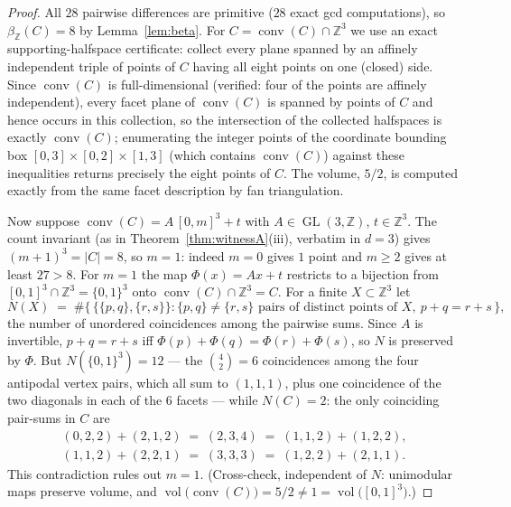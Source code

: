 \documentclass[11pt]{article}
\theoremstyle{remark}
\newcommand{\Z}{\mathbb{Z}}
\newcommand{\conv}{\operatorname{conv}}
\newcommand{\vol}{\operatorname{vol}}
\newcommand{\betaZ}{\beta_{\Z}}
\newcommand{\GL}{\operatorname{GL}}
\begin{document}
\begin{proof}
All $28$ pairwise differences are primitive ($28$ exact gcd computations),
so $\betaZ(C) = 8$ by Lemma~\ref{lem:beta}. For $C = \conv(C) \cap \Z^3$ we
use an exact supporting-halfspace certificate: collect every plane spanned by
an affinely independent triple of points of $C$ having all eight points on
one (closed) side. Since $\conv(C)$ is full-dimensional (verified: four of
the points are affinely independent), every facet plane of $\conv(C)$ is
spanned by points of $C$ and hence occurs in this collection, so the
intersection of the collected halfspaces is exactly $\conv(C)$; enumerating
the integer points of the coordinate bounding box
$[0,3] \times [0,2] \times [1,3]$ (which contains $\conv(C)$) against these
inequalities returns precisely the eight points of $C$. The volume,
$5/2$, is computed exactly from the same facet description by fan
triangulation.

Now suppose $\conv(C) = A\,[0,m]^3 + t$ with $A \in \GL(3,\Z)$,
$t \in \Z^3$. The count invariant (as in Theorem~\ref{thm:witnessA}(iii),
verbatim in $d = 3$) gives $(m+1)^3 = |C| = 8$, so $m = 1$: indeed $m = 0$
gives $1$ point and $m \ge 2$ gives at least $27 > 8$. For $m = 1$ the map
$\Phi(x) = Ax + t$ restricts to a bijection from
$[0,1]^3 \cap \Z^3 = \{0,1\}^3$ onto $\conv(C) \cap \Z^3 = C$. For a finite
$X \subset \Z^3$ let
\[
N(X) \;=\; \#\bigl\{\, \{\{p,q\},\{r,s\}\} :
\{p,q\} \neq \{r,s\} \text{ pairs of distinct points of } X,\
p + q = r + s \,\bigr\},
\]
the number of unordered coincidences among the pairwise sums.
Since $A$ is invertible, $p + q = r + s$ iff
$\Phi(p) + \Phi(q) = \Phi(r) + \Phi(s)$, so $N$ is preserved by $\Phi$. But
$N(\{0,1\}^3) = 12$ --- the $\binom{4}{2} = 6$ coincidences among the four
antipodal vertex pairs, which all sum to $(1,1,1)$, plus one coincidence of
the two diagonals in each of the $6$ facets --- while $N(C) = 2$: the only
coinciding pair-sums in $C$ are
\begin{gather*}
(0,2,2) + (2,1,2) \;=\; (2,3,4) \;=\; (1,1,2) + (1,2,2),\\
(1,1,2) + (2,2,1) \;=\; (3,3,3) \;=\; (1,2,2) + (2,1,1).
\end{gather*}
This contradiction rules out $m = 1$. (Cross-check, independent of $N$:
unimodular maps preserve volume, and
$\vol\bigl(\conv(C)\bigr) = 5/2 \neq 1 = \vol\bigl([0,1]^3\bigr)$.)
\end{proof}
\end{document}

